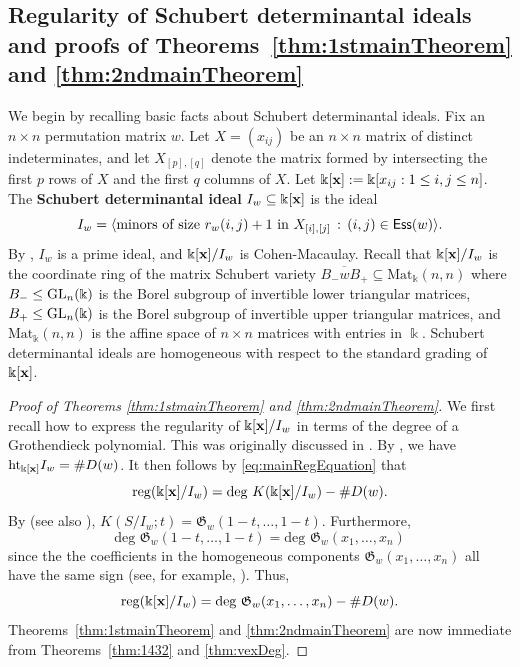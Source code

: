 \documentclass[12pt]{amsart}
\theoremstyle{definition}
\theoremstyle{remark}
\numberwithin{equation}{section}
\newcommand\mydef[1]{{\bf #1}}
\newcommand{\Ess}{{\sf Ess}}
\newcommand{\GL}{{\rm GL}}
\newcommand{\reg}{{\rm reg}}
\begin{document}
\subsection{Regularity of Schubert determinantal ideals and proofs of Theorems~\ref{thm:1stmainTheorem} and \ref{thm:2ndmainTheorem}}\label{sect:SchubBackground}


We begin by recalling basic facts about Schubert determinantal ideals. Fix an $n\times n$ permutation matrix $w$.  Let $X = (x_{ij})$ be an $n\times n$ matrix of distinct indeterminates, and let $X_{[p],[q]}$ denote the matrix formed by intersecting the first $p$ rows of $X$ and the first $q$ columns of $X$. Let $\Bbbk[{\bf x}] := \Bbbk[x_{ij}:1\leq i,j\leq n ]$. The \mydef{Schubert determinantal ideal} $I_w\subseteq \Bbbk[{\bf x}]$ is the ideal  
\[I_w = \langle \text{minors of size } r_w(i,j)+1 \text{ in } X_{[i],[j]}\,:  \, (i,j)\in \Ess(w) \rangle.\]
By \cite{Fulton.Flags}, $I_w$ is a prime ideal, and $\Bbbk[{\bf x}]/I_w$ is Cohen-Macaulay. Recall that $\Bbbk[{\bf x}]/I_w$ is the coordinate ring of the matrix Schubert variety $\overline{B_- w B_+}\subseteq \text{Mat}_{\Bbbk}(n,n)$ where $B_-\leq \GL_n(\Bbbk)$ is the Borel subgroup of invertible lower triangular matrices, $B_+\leq \GL_n(\Bbbk)$ is the Borel subgroup of invertible upper triangular matrices, and $\text{Mat}_{\Bbbk }(n,n)$ is the affine space of $n\times n$ matrices with entries in $\Bbbk$. Schubert determinantal ideals are homogeneous with respect to the standard grading of $\Bbbk[{\bf x}]$.





\begin{proof}[Proof of Theorems \ref{thm:1stmainTheorem} and \ref{thm:2ndmainTheorem}]
We first recall how to express the regularity of  $\Bbbk[{\bf x}]/I_w$ in terms of the degree of a Grothendieck polynomial. This was originally discussed in \cite{RRRSW}. By \cite{Fulton.Flags}, we have $\text{ht}_{\Bbbk[{\bf x}]} I_w=\#D(w)$. It then follows by \eqref{eq:mainRegEquation} that 
\[
\reg(\Bbbk[{\bf x}]/I_w) 
 = \text{deg } K(\Bbbk[{\bf x}]/I_w) - \#D(w).
\]
By \cite[Theorem~2.1]{Buc02} (see also \cite[Theorem~A]{KM}), $K(S/I_w;t)=\mathfrak G_w(1-t,\ldots,1-t)$. Furthermore,\[\text{deg }\mathfrak G_w(1-t,\ldots,1-t) = \text{deg }\mathfrak G_w(x_1,\ldots,x_n)\] 
since the the coefficients in the homogeneous components $\mathfrak G_w(x_1,\ldots,x_n)$ all have the same sign (see, for example, \cite{KM}). Thus, 
\begin{equation}\label{eq:schubReg}
\reg(\Bbbk[{\bf x}]/I_w)  = \text{deg } \mathfrak{G}_w(x_1,\dots, x_n) - \#D(w).
\end{equation}
Theorems~\ref{thm:1stmainTheorem} and \ref{thm:2ndmainTheorem} are now immediate from Theorems~\ref{thm:1432} and \ref{thm:vexDeg}.
\end{proof}
\end{document}
